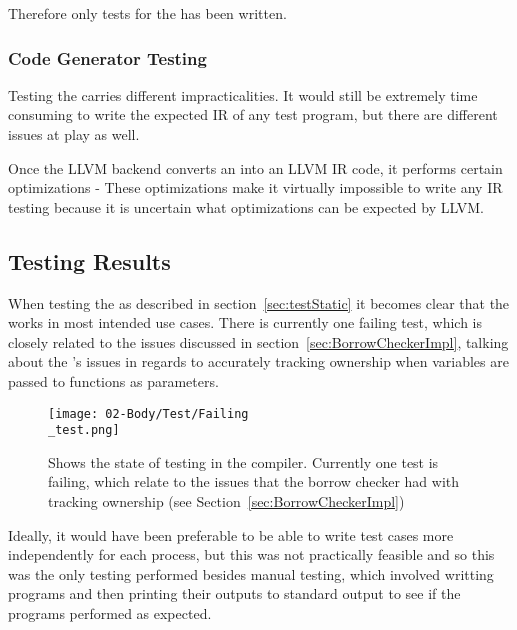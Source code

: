 Therefore only tests for the \borrowChecker{} has been written.

\subsubsection{Code Generator Testing}

Testing the \codeGen{} carries different impracticalities. It would still be
extremely time consuming to write the expected IR of any test program, but there are
different issues at play as well. 

Once the LLVM backend converts an \ast{} into an LLVM IR code, it performs certain
optimizations - These optimizations make it virtually impossible to write any IR
testing because it is uncertain what optimizations can be expected by LLVM.

\subsection{Testing Results}

When testing the \borrowChecker{} as described in section~\ref{sec:testStatic} it
becomes clear that the \borrowChecker{} works in most intended use cases. There is
currently one failing test, which is closely related to the issues discussed in
section~\ref{sec:BorrowCheckerImpl}, talking about the \borrowChecker's issues in
regards to accurately tracking ownership when variables are passed to functions as
parameters.

\begin{figure}[ht]
  \texttt{[image: 02-Body/Test/Failing\\\_test.png]}
  \caption{Shows the state of testing in the \lang{} compiler. Currently one test is
  failing, which relate to the issues that the borrow checker had with tracking
ownership (see Section~\ref{sec:BorrowCheckerImpl})}
  \label{fig:failTest}
\end{figure}

Ideally, it would have been preferable to be able to write test cases more
independently for each process, but this was not practically feasible and so this was
the only testing performed besides manual testing, which involved writting programs
and then printing their outputs to standard output to see if the programs performed
as expected.

\newpage
